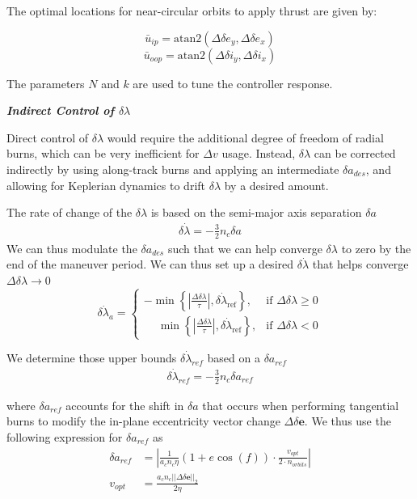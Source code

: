 The optimal locations for near-circular orbits to apply thrust are given by:

\[
\bar{u}_{ip} = \text{atan2} \left( \Delta \delta e_y, \Delta \delta e_x \right)
\]
\[
\bar{u}_{oop} = \text{atan2} \left( \Delta \delta i_y, \Delta \delta i_x \right)
\]

The parameters $N$ and $k$ are used to tune the controller response. 

\textbf{\textit{Indirect Control of $\delta\lambda$}}

Direct control of $\delta \lambda$ would require the additional degree of freedom of radial burns, which can be very inefficient for $\Delta v$ usage. Instead, $\delta \lambda$ can be corrected indirectly by using along-track burns and applying an intermediate $\delta a_{des}$, and allowing for Keplerian dynamics to drift $\delta \lambda$ by a desired amount. \cite{steindorf2017constrained}

The rate of change of the $\delta \lambda$ is based on the semi-major axis separation $\delta a$
\begin{align}
    \delta \dot{\lambda} = -\frac{3}{2}n_c \delta a 
\end{align}
We can thus modulate the $\delta a_{des}$ such that we can help converge $\delta \lambda$ to zero by the end of the maneuver period. We can thus set up a desired $\delta \dot{\lambda}$ that helps converge $\Delta \delta \lambda \rightarrow 0$
\begin{equation}
\delta \dot{\lambda}_a =
\begin{cases}
-\min \left\{ \left| \frac{\Delta \delta \lambda}{\tau} \right| , \delta \dot{\lambda}_{\text{ref}} \right\}, & \text{if } \Delta \delta \lambda \geq 0 \\
\phantom{-}\min \left\{ \left| \frac{\Delta \delta \lambda}{\tau} \right| , \delta \dot{\lambda}_{\text{ref}} \right\}, & \text{if } \Delta \delta \lambda < 0
\end{cases}
\end{equation}

We determine those upper bounds $\delta \dot{\lambda}_{ref}$ based on a $\delta a_{ref}$
\begin{align}
    \delta \dot{\lambda}_{ref} = -\frac{3}{2} n_c \delta a_{ref}
\end{align}

where $\delta a_{ref}$ accounts for the shift in $\delta a$ that occurs when performing tangential burns to modify the in-plane eccentricity vector change $\Delta \delta \textbf{e}$. We thus use the following expression for $\delta a_{ref}$ as
\begin{align}
    \delta a_{ref} &= \left|\frac{1}{a_cn_c \eta}(1 + e \cos(f))\cdot  \frac{v_{opt}}{2\cdot n_{orbits}}\right| \\
    v_{opt} &= \frac{a_cn_c||\Delta\delta \textbf{e}||_2}{2\eta}
\end{align}


